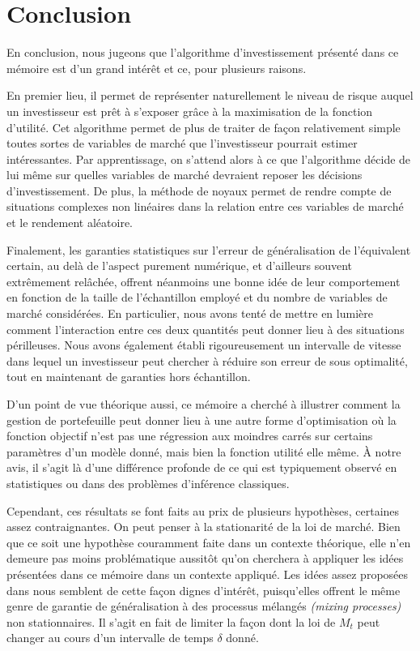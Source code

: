 \section{Conclusion}
\label{sec:conclusion}


En conclusion, nous jugeons que l'algorithme d'investissement présenté dans ce mémoire est
d'un grand intérêt et ce, pour plusieurs raisons.

En premier lieu, il permet de représenter naturellement le niveau de risque auquel un
investisseur est prêt à s'exposer grâce à la maximisation de la fonction d'utilité. Cet
algorithme permet de plus de traiter de façon relativement simple toutes sortes de
variables de marché que l'investisseur pourrait estimer intéressantes. Par apprentissage,
on s'attend alors à ce que l'algorithme décide de lui même sur quelles variables de marché
devraient reposer les décisions d'investissement. De plus, la méthode de noyaux permet de
rendre compte de situations complexes non linéaires dans la relation entre ces variables
de marché et le rendement aléatoire.

Finalement, les garanties statistiques sur l'erreur de généralisation de l'équivalent
certain, au delà de l'aspect purement numérique, et d'ailleurs souvent extrêmement
relâchée, offrent néanmoins une bonne idée de leur comportement en fonction de la taille
de l'échantillon employé et du nombre de variables de marché considérées. En particulier,
nous avons tenté de mettre en lumière comment l'interaction entre ces deux quantités peut
donner lieu à des situations périlleuses. Nous avons également établi rigoureusement un
intervalle de vitesse dans lequel un investisseur peut chercher à réduire son erreur de
sous optimalité, tout en maintenant de garanties hors échantillon.

D'un point de vue théorique aussi, ce mémoire a cherché à illustrer comment la gestion de
portefeuille peut donner lieu à une autre forme d'optimisation où la fonction objectif
n'est pas une régression aux moindres carrés sur certains paramètres d'un modèle donné,
mais bien la fonction utilité elle même. À notre avis, il s'agit là d'une différence
profonde de ce qui est typiquement observé en statistiques ou dans des problèmes
d'inférence classiques.

Cependant, ces résultats se font faits au prix de plusieurs hypothèses, certaines assez
contraignantes. On peut penser à la stationarité de la loi de marché. Bien que ce soit une
hypothèse couramment faite dans un contexte théorique, elle n'en demeure pas moins
problématique aussitôt qu'on cherchera à appliquer les idées présentées dans ce mémoire
dans un contexte appliqué. Les idées assez proposées dans
\cite{kuznetsov2017generalization} nous semblent de cette façon dignes d'intérêt,
puisqu'elles offrent le même genre de garantie de généralisation à des processus mélangés
\textsl{(mixing processes)} non stationnaires. Il s'agit en fait de limiter la façon dont
la loi de $M_t$ peut changer au cours d'un intervalle de temps $\delta$ donné.

